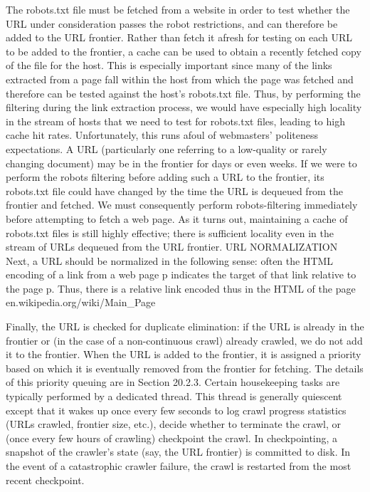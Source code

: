 The robots.txt file must be fetched from a website in order to test whether
the URL under consideration passes the robot restrictions, and can therefore
be added to the URL frontier. Rather than fetch it afresh for testing on
each URL to be added to the frontier, a cache can be used to obtain a recently
fetched copy of the file for the host. This is especially important since
many of the links extracted from a page fall within the host from which the
page was fetched and therefore can be tested against the host’s robots.txt
file. Thus, by performing the filtering during the link extraction process, we
would have especially high locality in the stream of hosts that we need to test
for robots.txt files, leading to high cache hit rates. Unfortunately, this runs
afoul of webmasters’ politeness expectations. A URL (particularly one referring
to a low-quality or rarely changing document) may be in the frontier for
days or even weeks. If we were to perform the robots filtering before adding
such a URL to the frontier, its robots.txt file could have changed by the time
the URL is dequeued from the frontier and fetched. We must consequently
perform robots-filtering immediately before attempting to fetch a web page.
As it turns out, maintaining a cache of robots.txt files is still highly effective;
there is sufficient locality even in the stream of URLs dequeued from the URL
frontier.
URL NORMALIZATION Next, a URL should be normalized in the following sense: often the HTML
encoding of a link from a web page p indicates the target of that link relative
to the page p. Thus, there is a relative link encoded thus in the HTML of the
page en.wikipedia.org/wiki/Main_Page

Finally, the URL is checked for duplicate elimination: if the URL is already
in the frontier or (in the case of a non-continuous crawl) already crawled,
we do not add it to the frontier. When the URL is added to the frontier, it is
assigned a priority based on which it is eventually removed from the frontier
for fetching. The details of this priority queuing are in Section 20.2.3.
Certain housekeeping tasks are typically performed by a dedicated thread.
This thread is generally quiescent except that it wakes up once every few
seconds to log crawl progress statistics (URLs crawled, frontier size, etc.),
decide whether to terminate the crawl, or (once every few hours of crawling)
checkpoint the crawl. In checkpointing, a snapshot of the crawler’s state (say,
the URL frontier) is committed to disk. In the event of a catastrophic crawler
failure, the crawl is restarted from the most recent checkpoint.


